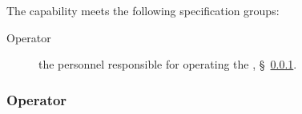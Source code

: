 The \ThisSys capability meets the following specification groups:

\begin{description}
	\item [Operator] the personnel responsible for operating the \ThisSys, \S~\ref{loc:CAP_Operator}.
\end{description}

\renewcommand{\ThisSegment}{Capability One\xspace}%

\KNEADSUBSUBSECTIONNEWPAGE
\subsubsection{Operator}
\label{loc:CAP_Operator}








%
%